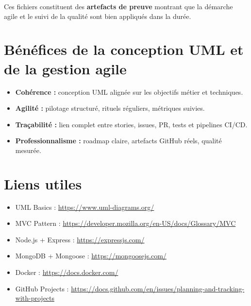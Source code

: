 Ces fichiers constituent des \textbf{artefacts de preuve} montrant que la démarche agile et le suivi de la qualité sont bien appliqués dans la durée.

\section{Bénéfices de la conception UML et de la gestion agile}

\begin{itemize}
    \item \textbf{Cohérence :} conception UML alignée sur les objectifs métier et techniques.
    \item \textbf{Agilité :} pilotage structuré, rituels réguliers, métriques suivies.
    \item \textbf{Traçabilité :} lien complet entre stories, issues, PR, tests et pipelines CI/CD.
    \item \textbf{Professionnalisme :} roadmap claire, artefacts GitHub réels, qualité mesurée.
\end{itemize}

\section{Liens utiles}

\begin{itemize}
    \item UML Basics : \url{https://www.uml-diagrams.org/}
    \item MVC Pattern : \url{https://developer.mozilla.org/en-US/docs/Glossary/MVC}
    \item Node.js + Express : \url{https://expressjs.com/}
    \item MongoDB + Mongoose : \url{https://mongoosejs.com/}
    \item Docker : \url{https://docs.docker.com/}
    \item GitHub Projects : \url{https://docs.github.com/en/issues/planning-and-tracking-with-projects}
\end{itemize}